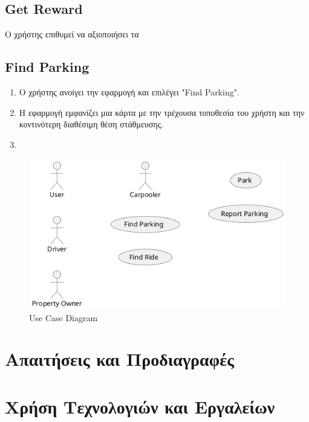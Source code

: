 \documentclass[11pt]{article}
\begin{document}
\subsection{Get Reward}
Ο χρήστης επιθυμεί να αξιοποιήσει τα


\subsection{Find Parking}

\begin{enumerate}
    \item Ο χρήστης ανοίγει την εφαρμογή και επιλέγει "Find Parking".
    \item Η εφαρμογή εμφανίζει μια κάρτα με την τρέχουσα τοποθεσία του χρήστη
          και την κοντινότερη διαθέσιμη θέση στάθμευσης.
    \item
\end{enumerate}

\begin{figure}
    \centering
    \includegraphics[width=\textwidth]{use-cases}
    \caption{Use Case Diagram}
\end{figure}

\section{Απαιτήσεις και Προδιαγραφές}

\section{Χρήση Τεχνολογιών και Εργαλείων}
\end{document}
